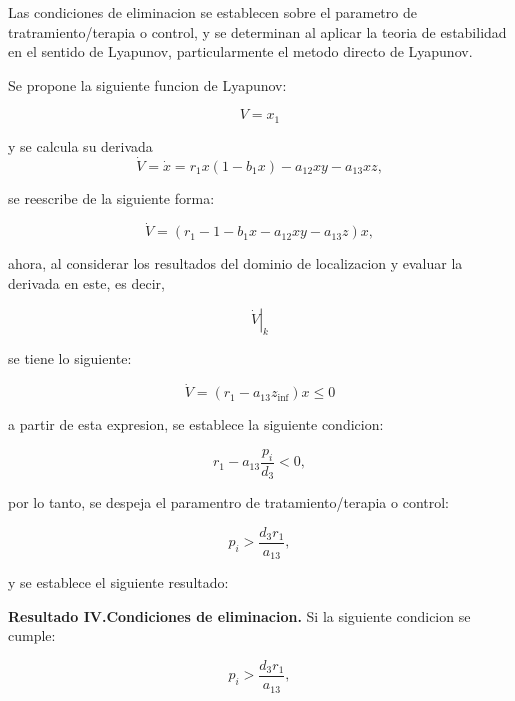 \documentclass[letterpaper,11pt]{article}
\begin{document}
Las condiciones de eliminacion se establecen sobre el parametro de
tratramiento/terapia o control, y se determinan al aplicar la teoria de
estabilidad en el sentido de Lyapunov, particularmente el metodo directo de
Lyapunov.

Se propone la siguiente funcion de Lyapunov:

\begin{equation*}
V=x_{1}
\end{equation*}

y se calcula su derivada 
\begin{equation*}
\dot{V}=\dot{x}=r_{1}x(1-b_{1}x)-a_{12}xy-a_{13}xz,
\end{equation*}

se reescribe de la siguiente forma:

\begin{equation*}
\dot{V}=(r_{1}-1-b_{1}x-a_{12}xy-a_{13}z)x,
\end{equation*}

ahora, al considerar los resultados del dominio de localizacion y evaluar la
derivada en este, es decir,

\begin{equation*}
\left. \dot{V}\right\vert _{k}
\end{equation*}

se tiene lo siguiente:

\begin{equation*}
\dot{V}=(r_{1}-a_{13}z_{\inf })x\leq 0
\end{equation*}

a partir de esta expresion, se establece la siguiente condicion:

\begin{equation*}
r_{1}-a_{13}\frac{p_{i}}{d_{3}}<0,
\end{equation*}

por lo tanto, se despeja el paramentro de tratamiento/terapia o control:

\begin{equation*}
p_{i}>\frac{d_{3}r_{1}}{a_{13}},
\end{equation*}

y se establece el siguiente resultado:

\bigskip

\textbf{Resultado IV.\textbf{Condiciones de eliminacion}.} Si la siguiente
condicion se cumple:

\begin{equation*}
p_{i}>\frac{d_{3}r_{1}}{a_{13}},
\end{equation*}
\end{document}
